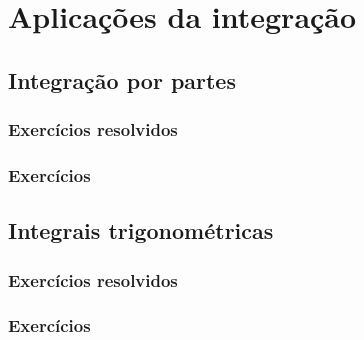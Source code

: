 
\chapter{Aplicações da integração}\label{cap:apl_integracao}

\emconstrucao

\section{Integração por partes}
\construirSec


\subsection*{Exercícios resolvidos}

\construirExeresol


\subsection*{Exercícios}

\construirExer


\section{Integrais trigonométricas}
\construirSec

\subsection*{Exercícios resolvidos}

\construirExeresol


\subsection*{Exercícios}

\construirExer


